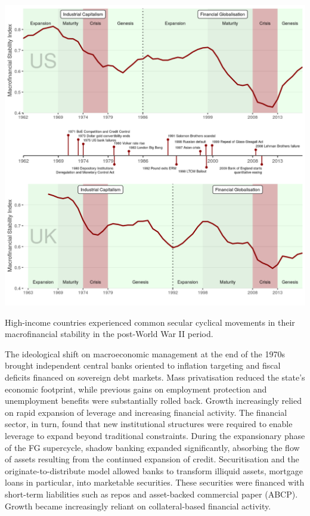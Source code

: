 \documentclass[
]{book}
\begin{document}
\includegraphics{fig/msi.png}

High-income countries experienced common secular cyclical movements in their
macrofinancial stability in the post-World War II period.

The ideological shift on macroeconomic management at the end of the 1970s brought independent
central banks oriented to inflation targeting and fiscal deficits financed on sovereign debt markets.
Mass privatisation reduced the state's economic footprint, while previous gains on employment
protection and unemployment benefits were substantially rolled back. Growth
increasingly relied on rapid expansion of leverage and increasing financial activity.
The financial sector, in turn, found that new institutional structures were required
to enable leverage to expand beyond traditional constraints.
During the expansionary phase of the FG supercycle, shadow banking expanded significantly,
absorbing the flow of assets resulting from the continued expansion of credit.
Securitisation and the originate-to-distribute model allowed banks to
transform illiquid assets, mortgage loans in particular, into marketable securities.
These securities were financed with short-term liabilities such as
repos and asset-backed commercial paper (ABCP).
Growth became increasingly reliant on collateral-based financial activity.
\end{document}
